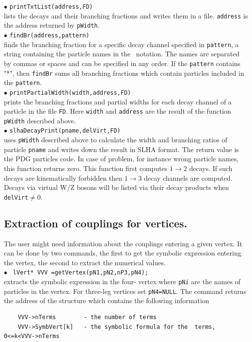 \documentclass[12pt,a4paper]{article}
\begin{document}
%
\noindent
$\bullet$ \verb|printTxtList(address,FD)|\\
lists the decays and their branching fractions and writes them in a file.
{\tt address} is the address returned by {\tt pWidth}. \\[2mm]
%
\noindent
$\bullet$ \verb|findBr(address,pattern)|\\ 
finds the branching fraction for a specific decay channel specified in
{\tt pattern},  a string containing the particle names 
in the \calchep\ notation. The names are separated by commas or spaces and can be specified in any
order. If the  {\tt pattern} contains  "*", then {\tt findBr} sums all branching fractions
which contain particles included in the {\tt pattern}.\\[2mm]
 \noindent
 $\bullet$ \verb|printPartialWidth(width,address,FD)|\\ 
prints the branching fractions and partial widths for each decay channel of a particle in the file {\tt FD}.   Here {\tt width} and {\tt address} are the result of the function  {\tt pWidth} described above.\\[2mm]
%
\noindent
$\bullet$ \verb|slhaDecayPrint(pname,delVirt,FD)|\\
uses \verb|pWidth| described above to calculate the width and branching ratios of particle \verb|pname| and writes down the result
in SLHA format. The return value is the PDG particles code. In case of problem, for
instance wrong particle names, this function returns zero. This function
first computes $1\to2$  decays. If such decays are kinematically
forbidden then $1\to3$ decay channels are computed. Decays via 
virtual W/Z bosons will be listed via their decay products when \verb|delVirt|$ \ne 0$.\\[2mm]
%
\subsection{ Extraction of couplings for vertices.}
\label{sec:Vertices}
  The user might need information about the couplings entering a given vertex. It can be done by two commands, the first to get the symbolic expression entering the vertex, the second to extract the numerical values. \\
$\bullet$ \verb| lVert* VVV =getVertex(pN1,pN2,nP3,pN4);|\\    
extracts the symbolic expression in the four- vertex where {\tt pN\it{i}} are the names of particles in the vertex. For three-leg vertices set {\tt pN4=NULL}. The command returns the address of the structure 
which contains  the following information \\
\begin{verbatim}
    VVV->nTerms        - the number of terms 
    VVV->SymbVert[k]   - the symbolic formula for the  terms, 0<=k<VVV->nTerms
\end{verbatim} 
\end{document}
